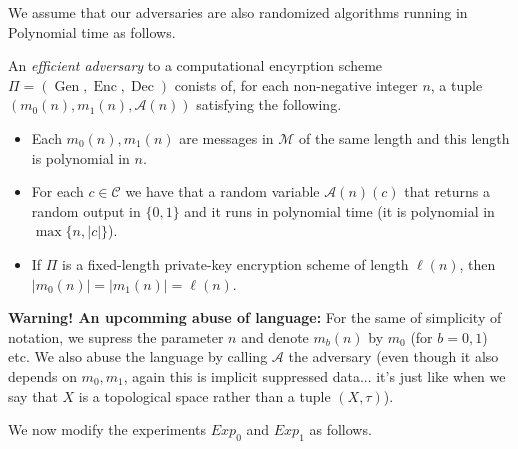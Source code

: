 \documentclass[twoside, a4paper, 10pt]{amsart}
\begin{document}
We assume that our adversaries are also randomized algorithms running in Polynomial time as follows.

\begin{mydef} An \textit{efficient adversary} to a computational encyrption scheme  $\Pi = (\operatorname{Gen}, \operatorname{Enc}, \operatorname{Dec})$ conists of, for each non-negative integer $n$, a tuple $(m_0(n), m_1(n), \mathcal{A}(n))$ satisfying the following.

\begin{itemize}
	\item Each $m_0(n),m_1(n)$ are messages in $\mathcal{M}$ of the same length and this length is polynomial in $n$.
	\item For each $c \in \mathcal{C}$ we have that a random variable $\mathcal{A}(n)(c)$ that returns a random output in $\{0,1\}$ and it runs in polynomial time (it is polynomial in $\max\{n, |c|\}$).
	\item If $\Pi$ is a fixed-length private-key encryption scheme of length $\ell(n)$, then $|m_0(n)|=|m_1(n)| = \ell(n)$.
\end{itemize}

\end{mydef}

\textbf{Warning! An upcomming abuse of language:} For the same of simplicity of notation, we supress the parameter $n$ and denote $m_b(n)$ by $m_0$ (for $b=0,1$) etc. We also abuse the language by calling $\mathcal{A}$ the adversary (even though it also depends on $m_0,m_1$, again this is implicit suppressed data... it's just like when we say that $X$ is a topological space rather than a tuple $(X,\tau)$).

We now modify the experiments $Exp_0$ and $Exp_1$ as follows.
\end{document}
